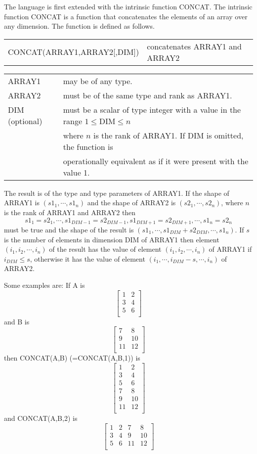 The language is first extended with the intrinsic function CONCAT.
The intrinsic function CONCAT is a function that concatenates the
elements of an array over any dimension.  The function is defined as follows.
\newline \begin{tabular}{ll}
CONCAT(ARRAY1,ARRAY2[,DIM]) & concatenates ARRAY1 and ARRAY2
\end{tabular} \newline
\begin{tabular}{ll}
ARRAY1 & may be of any type. \\
ARRAY2 & must be of the same type and rank as ARRAY1. \\
DIM (optional) & must be a scalar of type integer with a value in the range
$1\leq$DIM$\leq n$ \\
 & where $n$ is the rank of ARRAY1.  If DIM is omitted, the function is \\
 & operationally equivalent as if it were present with the value 1. \\
\end{tabular} \newline
The result is of the type and type parameters of ARRAY1.
If the shape of ARRAY1 is $(s1_{1},\cdots,s1_{n})$ and the shape of 
ARRAY2 is $(s2_{1},\cdots,s2_{n})$, where $n$ is the rank of ARRAY1 and ARRAY2
then 
$$s1_{1}=s2_{1},\cdots,s1_{DIM-1}=s2_{DIM-1},s1_{DIM+1}=s2_{DIM+1},\cdots,
	s1_{n}=s2_{n}$$ must be true and the shape of the result
is $(s1_{1},\cdots,s1_{DIM}+s2_{DIM},\cdots,s1_{n})$.
If $s$ is the number of elements in 
dimension DIM of ARRAY1 then
element $(i_{1},i_{2},\cdots,i_{n})$ of the result has the value of
element $(i_{1},i_{2},\cdots,i_{n})$ of ARRAY1 if $i_{DIM}\leq s$, otherwise
it has the value of element $(i_{1},\cdots,i_{DIM}-s,\cdots,i_{n})$ of
ARRAY2.

Some examples are:
If A is 
$$\left[ \begin{array}{ll}
1 & 2 \\
3 & 4 \\
5 & 6 \\
\end{array} \right] $$
and B is
$$\left[ \begin{array}{ll}
7 & 8 \\
9 & 10 \\
11 & 12 \\
\end{array} \right] $$
then CONCAT(A,B) (=CONCAT(A,B,1)) is
$$\left[ \begin{array}{ll}
1 & 2 \\
3 & 4 \\
5 & 6 \\
7 & 8 \\
9 & 10 \\
11 & 12 \\
\end{array} \right] $$
and CONCAT(A,B,2) is
$$\left[ \begin{array}{llll}
1 & 2 & 7 & 8 \\
3 & 4 & 9 & 10 \\
5 & 6 & 11 & 12 \\
\end{array} \right] $$


